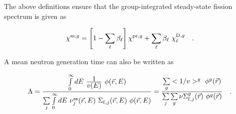 \vskip 0.2cm

The above definitions ensure that the group-integrated steady-state fission spectrum is given as

\begin{equation}
\chi^{{\rm ss},g} = \left[1-\sum_\ell\beta_\ell\right] \chi^{{\rm pr},g}+\sum_\ell \beta_\ell \ \chi_\ell^{{\rm D},g} \ \ \ .
\end{equation}

\vskip 0.2cm

A mean neutron generation time can also be written as

\begin{equation}
\Lambda={\int\limits_0^\infty dE \ {\displaystyle 1 \over \displaystyle v(E)} \ \phi(\vec r,E) \over
\sum\limits_j{\int\limits_0^\infty dE \
\nu_j^{\rm ss}(\vec r,E)\ \Sigma_{{\rm f},j}(\vec r,E) \ \phi(\vec r,E)}}={\sum\limits_g <1/v>^g \ \phi^g(\vec r) \over
\sum\limits_j{\sum\limits_g \nu\Sigma_{{\rm f},j}^g(\vec r) \ \phi^g(\vec r)}} \ \ \ .
\end{equation}

\eject
